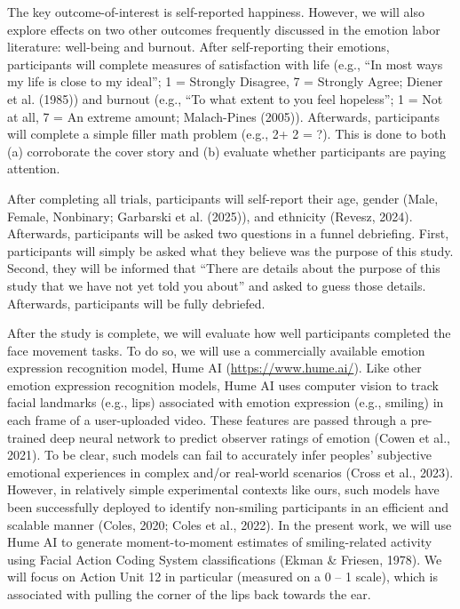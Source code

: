 \documentclass[
  letterpaper,
  DIV=11,
  numbers=noendperiod]{scrartcl}
\begin{document}
The key outcome-of-interest is self-reported happiness. However, we will
also explore effects on two other outcomes frequently discussed in the
emotion labor literature: well-being and burnout. After self-reporting
their emotions, participants will complete measures of satisfaction with
life (e.g., ``In most ways my life is close to my ideal''; 1 = Strongly
Disagree, 7 = Strongly Agree; Diener et al. (1985)) and burnout (e.g.,
``To what extent to you feel hopeless''; 1 = Not at all, 7 = An extreme
amount; Malach-Pines (2005)). Afterwards, participants will complete a
simple filler math problem (e.g., 2+ 2 = ?). This is done to both (a)
corroborate the cover story and (b) evaluate whether participants are
paying attention.

After completing all trials, participants will self-report their age,
gender (Male, Female, Nonbinary; Garbarski et al. (2025)), and ethnicity
(Revesz, 2024). Afterwards, participants will be asked two questions in
a funnel debriefing. First, participants will simply be asked what they
believe was the purpose of this study. Second, they will be informed
that ``There are details about the purpose of this study that we have
not yet told you about'' and asked to guess those details. Afterwards,
participants will be fully debriefed.

After the study is complete, we will evaluate how well participants
completed the face movement tasks. To do so, we will use a commercially
available emotion expression recognition model, Hume AI
(\url{https://www.hume.ai/}). Like other emotion expression recognition
models, Hume AI uses computer vision to track facial landmarks (e.g.,
lips) associated with emotion expression (e.g., smiling) in each frame
of a user-uploaded video. These features are passed through a
pre-trained deep neural network to predict observer ratings of emotion
(Cowen et al., 2021). To be clear, such models can fail to accurately
infer peoples' subjective emotional experiences in complex and/or
real-world scenarios (Cross et al., 2023). However, in relatively simple
experimental contexts like ours, such models have been successfully
deployed to identify non-smiling participants in an efficient and
scalable manner (Coles, 2020; {Coles et al.}, 2022). In the present
work, we will use Hume AI to generate moment-to-moment estimates of
smiling-related activity using Facial Action Coding System
classifications (Ekman \& Friesen, 1978). We will focus on Action Unit
12 in particular (measured on a 0 -- 1 scale), which is associated with
pulling the corner of the lips back towards the ear.
\end{document}

